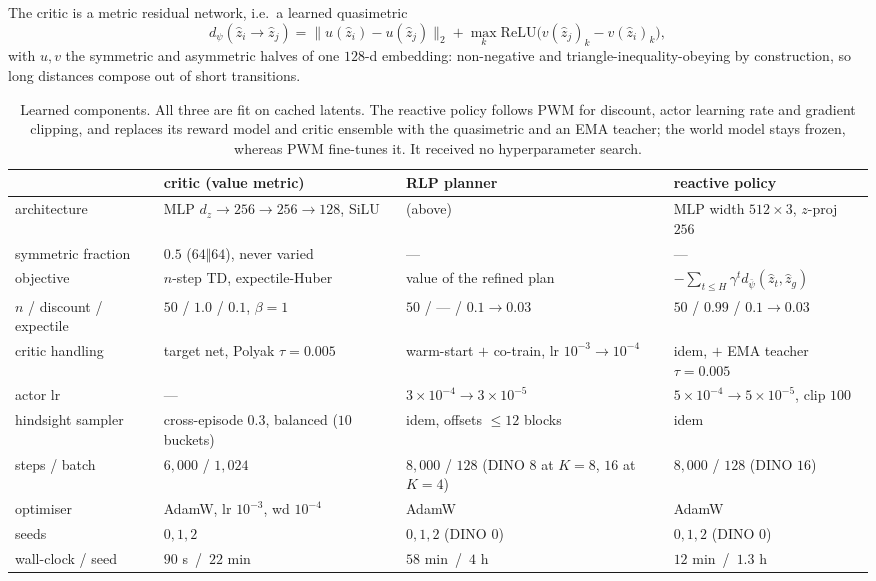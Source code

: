 The critic is a metric residual network, i.e.\ a learned quasimetric
\begin{equation*}
  d_\psi(\hat z_i \to \hat z_j)
  = \lVert u(\hat z_i) - u(\hat z_j)\rVert_2
  + \max_k \mathrm{ReLU}\bigl(v(\hat z_j)_k - v(\hat z_i)_k\bigr),
\end{equation*}
with $u,v$ the symmetric and asymmetric halves of one $128$-d embedding:
non-negative and triangle-inequality-obeying by construction, so long
distances compose out of short transitions.

\begin{table}[h]
\centering\small
\caption{Learned components. All three are fit on cached latents. The
reactive policy follows PWM \citep{georgiev2024pwm} for discount, actor
learning rate and gradient clipping, and replaces its reward model and
critic ensemble with the quasimetric and an EMA teacher; the world model
stays frozen, whereas PWM fine-tunes it. It received no hyperparameter
search.}
\begin{tabular}{llll}
\toprule
 & critic (value metric) & RLP planner & reactive policy \\
\midrule
architecture & MLP $d_z\!\to\!256\!\to\!256\!\to\!128$, SiLU
 & \multicolumn{1}{l}{(above)}
 & MLP width $512\times3$, $z$-proj $256$ \\
symmetric fraction & $0.5$ ($64\Vert64$), never varied & --- & --- \\
objective & $n$-step TD, expectile-Huber
 & value of the refined plan
 & $-\sum_{t\le H}\gamma^t d_{\bar\psi}(\hat z_t,\hat z_g)$ \\
$n$ / discount / expectile & $50$ / $1.0$ / $0.1$, $\beta{=}1$
 & $50$ / --- / $0.1\!\to\!0.03$
 & $50$ / $0.99$ / $0.1\!\to\!0.03$ \\
critic handling & target net, Polyak $\tau{=}0.005$
 & warm-start $+$ co-train, lr $10^{-3}\!\to\!10^{-4}$
 & idem, $+$ EMA teacher $\tau{=}0.005$ \\
actor lr & --- & $3\!\times\!10^{-4}\!\to\!3\!\times\!10^{-5}$
 & $5\!\times\!10^{-4}\!\to\!5\!\times\!10^{-5}$, clip $100$ \\
hindsight sampler & cross-episode $0.3$, balanced ($10$ buckets)
 & idem, offsets $\le\!12$ blocks & idem \\
steps / batch & $6{,}000$ / $1{,}024$
 & $8{,}000$ / $128$ (DINO $8$ at $K{=}8$, $16$ at $K{=}4$)
 & $8{,}000$ / $128$ (DINO $16$) \\
optimiser & AdamW, lr $10^{-3}$, wd $10^{-4}$ & AdamW & AdamW \\
seeds & $0,1,2$ & $0,1,2$ (DINO $0$) & $0,1,2$ (DINO $0$) \\
wall-clock / seed & $90$ s \,/\, $22$ min & $58$ min \,/\, $4$ h & $12$ min \,/\, $1.3$ h \\
\bottomrule
\end{tabular}
\end{table}

